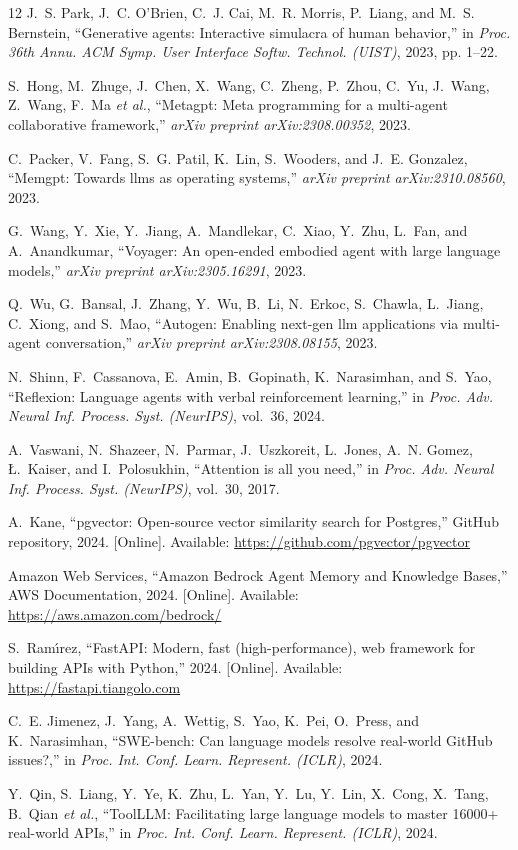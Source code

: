 \documentclass[lettersize,journal]{IEEEtran}
\begin{document}
\begin{thebibliography}{12}
J.~S. Park, J.~C. O'Brien, C.~J. Cai, M.~R. Morris, P.~Liang, and M.~S. Bernstein, ``Generative agents: Interactive simulacra of human behavior,'' in \emph{Proc. 36th Annu. ACM Symp. User Interface Softw. Technol. (UIST)}, 2023, pp. 1--22.

S.~Hong, M.~Zhuge, J.~Chen, X.~Wang, C.~Zheng, P.~Zhou, C.~Yu, J.~Wang, Z.~Wang, F.~Ma \emph{et al.}, ``Metagpt: Meta programming for a multi-agent collaborative framework,'' \emph{arXiv preprint arXiv:2308.00352}, 2023.

C.~Packer, V.~Fang, S.~G. Patil, K.~Lin, S.~Wooders, and J.~E. Gonzalez, ``Memgpt: Towards llms as operating systems,'' \emph{arXiv preprint arXiv:2310.08560}, 2023.

G.~Wang, Y.~Xie, Y.~Jiang, A.~Mandlekar, C.~Xiao, Y.~Zhu, L.~Fan, and A.~Anandkumar, ``Voyager: An open-ended embodied agent with large language models,'' \emph{arXiv preprint arXiv:2305.16291}, 2023.

Q.~Wu, G.~Bansal, J.~Zhang, Y.~Wu, B.~Li, N.~Erkoc, S.~Chawla, L.~Jiang, C.~Xiong, and S.~Mao, ``Autogen: Enabling next-gen llm applications via multi-agent conversation,'' \emph{arXiv preprint arXiv:2308.08155}, 2023.

N.~Shinn, F.~Cassanova, E.~Amin, B.~Gopinath, K.~Narasimhan, and S.~Yao, ``Reflexion: Language agents with verbal reinforcement learning,'' in \emph{Proc. Adv. Neural Inf. Process. Syst. (NeurIPS)}, vol.~36, 2024.

A.~Vaswani, N.~Shazeer, N.~Parmar, J.~Uszkoreit, L.~Jones, A.~N. Gomez, {\L}.~Kaiser, and I.~Polosukhin, ``Attention is all you need,'' in \emph{Proc. Adv. Neural Inf. Process. Syst. (NeurIPS)}, vol.~30, 2017.

A.~Kane, ``pgvector: Open-source vector similarity search for Postgres,'' GitHub repository, 2024. [Online]. Available: \url{https://github.com/pgvector/pgvector}

Amazon Web Services, ``Amazon Bedrock Agent Memory and Knowledge Bases,'' AWS Documentation, 2024. [Online]. Available: \url{https://aws.amazon.com/bedrock/}

S.~Ram{\'\i}rez, ``FastAPI: Modern, fast (high-performance), web framework for building APIs with Python,'' 2024. [Online]. Available: \url{https://fastapi.tiangolo.com}

C.~E. Jimenez, J.~Yang, A.~Wettig, S.~Yao, K.~Pei, O.~Press, and K.~Narasimhan, ``SWE-bench: Can language models resolve real-world GitHub issues?,'' in \emph{Proc. Int. Conf. Learn. Represent. (ICLR)}, 2024.

Y.~Qin, S.~Liang, Y.~Ye, K.~Zhu, L.~Yan, Y.~Lu, Y.~Lin, X.~Cong, X.~Tang, B.~Qian \emph{et al.}, ``ToolLLM: Facilitating large language models to master 16000+ real-world APIs,'' in \emph{Proc. Int. Conf. Learn. Represent. (ICLR)}, 2024.
\end{thebibliography}
\end{document}
